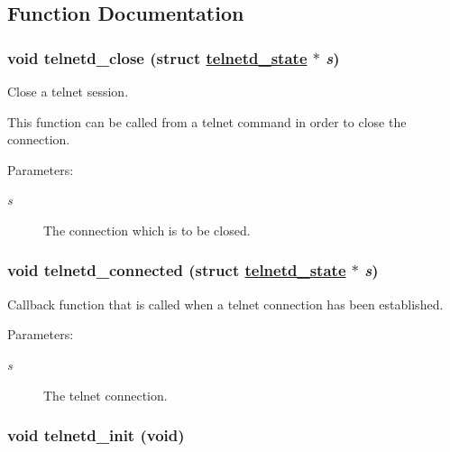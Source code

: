 \subsection{Function Documentation}
\hypertarget{a00081_g816bdc3e31e05e0979efe91a697b10ad}{
\subsubsection[telnetd\_\-close]{\setlength{\rightskip}{0pt plus 5cm}void telnetd\_\-close (struct \hyperlink{a00027}{telnetd\_\-state} $\ast$ {\em s})}}
\label{a00081_g816bdc3e31e05e0979efe91a697b10ad}


Close a telnet session. 

This function can be called from a telnet command in order to close the connection.

\begin{Desc}
\item[Parameters:]
\begin{description}
\item[{\em s}]The connection which is to be closed. \end{description}
\end{Desc}
\hypertarget{a00081_g992adc34dbe12cd28c2e5cc4c043b461}{
\subsubsection[telnetd\_\-connected]{\setlength{\rightskip}{0pt plus 5cm}void telnetd\_\-connected (struct \hyperlink{a00027}{telnetd\_\-state} $\ast$ {\em s})}}
\label{a00081_g992adc34dbe12cd28c2e5cc4c043b461}


Callback function that is called when a telnet connection has been established. 

\begin{Desc}
\item[Parameters:]
\begin{description}
\item[{\em s}]The telnet connection. \end{description}
\end{Desc}
\hypertarget{a00081_g82ff99d50221f7c17df57dc6092ffc97}{
\subsubsection[telnetd\_\-init]{\setlength{\rightskip}{0pt plus 5cm}void telnetd\_\-init (void)}}
\label{a00081_g82ff99d50221f7c17df57dc6092ffc97}


